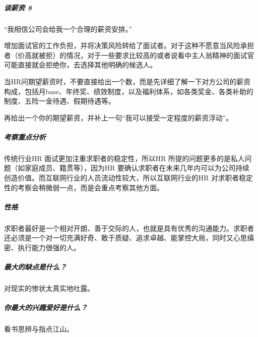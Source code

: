 \documentclass[letterpaper,10pt,english]{sphinxmanual}
\begin{document}
\subparagraph{谈薪资 8\sphinxfootnotemark[890]}
\label{\detokenize{chapter_interview/HR:id2}}%
\begin{footnotetext}[890]\sphinxAtStartFootnote
{}
%
\end{footnotetext}\ignorespaces 
“我相信公司会给我一个合理的薪资安排。”

增加面试官的工作负担，并将决策风险转给了面试者。对于这种不愿意当风险承担者（价高就被拒）的情况，对于一些要求比较高的或者说看中主人翁精神的面试官可能直接就会拒绝你，去选择其他明确的候选人。

当HR问期望薪资时，不要直接给出一个数，而是先详细了解一下对方公司的薪资构成，包括月base、年终奖、绩效制度，以及福利体系，如各类奖金、各类补助的制度、五险一金待遇、假期待遇等。%
\begin{footnote}[891]\sphinxAtStartFootnote
{}
%
\end{footnote}再给出一个你的期望薪资，并补上一句“我可以接受一定程度的薪资浮动”。

\begin{center}\end{center}  


\subparagraph{考察重点分析}
\label{\detokenize{chapter_interview/HR:id3}}
传统行业HR 面试更加注重求职者的稳定性，所以HR
所提的问题更多的是私人问题（如家庭成员、籍贯等），因为HR
要确认求职者在未来几年内可以为公司持续创造价值。而互联网行业的人员流动性较大，所以互联网行业的HR
对求职者稳定性的考察会稍微弱一点，而是会重点考察其他方面。


\subparagraph{性格}
\label{\detokenize{chapter_interview/HR:id4}}
求职者最好是一个相对开朗、善于交际的人，也就是具有优秀的沟通能力。求职者还必须是一个对一切充满好奇、敢于质疑、追求卓越、能掌控大局，同时又心思缜密、执行能力很强的人。


\subparagraph{最大的缺点是什么？}
\label{\detokenize{chapter_interview/HR:id5}}
对现实的惨状太真实地吐露。


\subparagraph{你最大的兴趣爱好是什么？}
\label{\detokenize{chapter_interview/HR:id6}}
看书思辨与指点江山。
\end{document}
